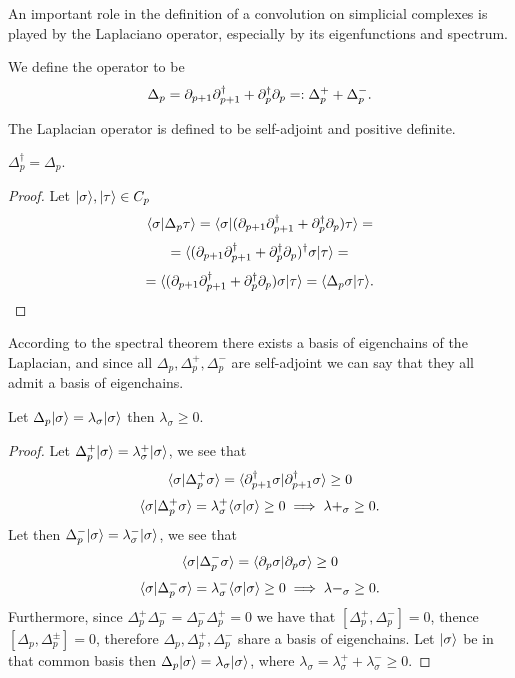 \documentclass[../1.tex]{subfiles}
\begin{document}
    An important role in the definition of a convolution on simplicial complexes is played by the Laplaciano operator,
    especially by its eigenfunctions and spectrum.
    
    \begin{defn}
        We define the  operator to be 
        \[ \Delta_p = \partial_{p+1}\partial^\dagger_{p+1} + \partial^\dagger_p\partial_p =: \Delta^+_p + \Delta^-_p.\]
    \end{defn}

    The Laplacian operator is defined to be self-adjoint and positive definite.

    \begin{prop}
        $\Delta^\dagger_p = \Delta_p.$
    \end{prop}
    \begin{proof}
        Let $| \sigma \rangle, | \tau \rangle \in C_p$ 
        \[ \langle \sigma | \Delta_p\tau \rangle=\langle \sigma | (\partial_{p+1}\partial^\dagger_{p+1} + \partial^\dagger_p\partial_p)\tau \rangle = \]
        \[ = \langle (\partial_{p+1}\partial^\dagger_{p+1} + \partial^\dagger_p\partial_p)^\dagger\sigma | \tau \rangle = \]
        \[ = \langle (\partial_{p+1}\partial^\dagger_{p+1} + \partial^\dagger_p\partial_p)\sigma | \tau \rangle = \langle \Delta_p\sigma | \tau \rangle. \]
    \end{proof}

    According to the spectral theorem there exists a basis of eigenchains of the Laplacian, and since all $\Delta_p, \Delta^+_p, \Delta^-_p$
    are self-adjoint we can say that they all admit a basis of eigenchains.

    \begin{prop}
        Let $\Delta_p| \sigma \rangle = \lambda_\sigma| \sigma \rangle$ then $\lambda_\sigma \geq 0$.
    \end{prop}
    \begin{proof}
        Let $\Delta^+_p| \sigma \rangle = \lambda^+_\sigma | \sigma \rangle$, we see that
        \[ \langle \sigma | \Delta^+_p\sigma \rangle = \langle \partial^\dagger_{p+1}\sigma | \partial^\dagger_{p+1}\sigma \rangle \geq 0 \]
        \[ \langle \sigma | \Delta^+_p\sigma \rangle = \lambda^+_\sigma\langle \sigma | \sigma \rangle \geq 0 \implies \lambda+_\sigma \geq 0.\]
        Let then $\Delta^-_p| \sigma \rangle = \lambda^-_\sigma | \sigma \rangle$, we see that
        \[ \langle \sigma | \Delta^-_p\sigma \rangle = \langle \partial_p\sigma | \partial_p\sigma \rangle \geq 0 \]
        \[ \langle \sigma | \Delta^-_p\sigma \rangle = \lambda^-_\sigma\langle \sigma | \sigma \rangle \geq 0 \implies \lambda-_\sigma \geq 0.\]
        Furthermore, since $\Delta^+_p\Delta^-_p = \Delta^-_p\Delta^+_p = 0$ we have that $[\Delta^+_p,\Delta^-_p] = 0$, thence
        $[\Delta_p, \Delta^\pm_p] = 0$, therefore $\Delta_p, \Delta^+_p, \Delta^-_p$ share a basis of eigenchains.
        Let $| \sigma \rangle$ be in that common basis then $\Delta_p| \sigma \rangle = \lambda_\sigma| \sigma \rangle$, where
        $\lambda_\sigma = \lambda^+_\sigma + \lambda^-_\sigma \geq 0$.
    \end{proof}
\end{document}
